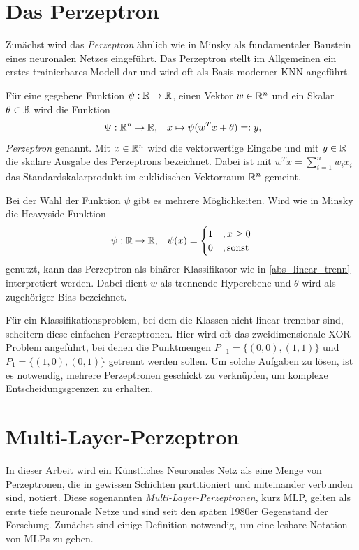 \section{Das Perzeptron}
\label{perzeptron_abs}
Zunächst wird das \textit{Perzeptron} ähnlich wie in Minsky \cite{minsky2017perceptrons} als fundamentaler Baustein eines neuronalen Netzes eingeführt. Das Perzeptron stellt im Allgemeinen ein erstes trainierbares Modell dar und wird oft als Basis moderner KNN angeführt. 
\begin{defi}[Perzeptron]
    \label{def_neuron}
    Für eine gegebene Funktion $\psi: \mathbb{R} \rightarrow \mathbb{R}$, einen Vektor $w \in \mathbb{R}^{n}$ und ein Skalar $\theta \in \mathbb{R}$ wird die Funktion 
    \[ \
    \Psi: \mathbb{R}^n \rightarrow \mathbb{R}, \; \; \; x \mapsto \psi(w^T x +\theta)=:y,
    \]
    \textit{Perzeptron} genannt. Mit $x \in \mathbb{R}^{n}$ wird die vektorwertige Eingabe und mit $y \in \mathbb{R}$ die skalare Ausgabe des Perzeptrons bezeichnet. Dabei ist mit $w^Tx=\sum_{i=1}^n w_i x_i$ das Standardskalarprodukt im euklidischen Vektorraum $\mathbb{R}^{n}$ gemeint.
\end{defi}
Bei der Wahl der Funktion $\psi$ gibt es mehrere Möglichkeiten. Wird wie in Minsky\cite{minsky2017perceptrons} die Heavyside-Funktion
\begin{equation*}
    \psi: \mathbb{R} \rightarrow \mathbb{R}, \; \; \;
    \psi(x)=\begin{cases}
       1 &, x \geq 0 \\
       0 &, \text{sonst}
    \end{cases}
\end{equation*} 
genutzt, kann das Perzeptron als binärer Klassifikator wie in \ref{abs_linear_trenn} interpretiert werden. Dabei dient $w$ als trennende Hyperebene und $\theta$ wird als zugehöriger Bias bezeichnet. 

Für ein Klassifikationsproblem, bei dem die Klassen nicht linear trennbar sind, scheitern diese einfachen Perzeptronen. Hier wird oft das zweidimensionale XOR-Problem angeführt, bei denen die Punktmengen $P_{-1}=\{(0,0),(1,1)\}$ und $P_{1}=\{(1,0),(0,1)\}$ getrennt werden sollen. Um solche Aufgaben zu lösen, ist es notwendig, mehrere Perzeptronen geschickt zu verknüpfen, um komplexe Entscheidungsgrenzen zu erhalten.

\section{Multi-Layer-Perzeptron}
In dieser Arbeit wird ein Künstliches Neuronales Netz als eine Menge von Perzeptronen, die in gewissen Schichten partitioniert und miteinander verbunden sind, notiert. Diese sogenannten \textit{Multi-Layer-Perzeptronen}, kurz MLP,  gelten als erste tiefe neuronale Netze und sind seit den späten 1980er Gegenstand der Forschung\cite{bourlard1990links,bounds1988multilayer,MLPbook}. Zunächst sind einige Definition notwendig, um eine lesbare Notation von MLPs zu geben.

